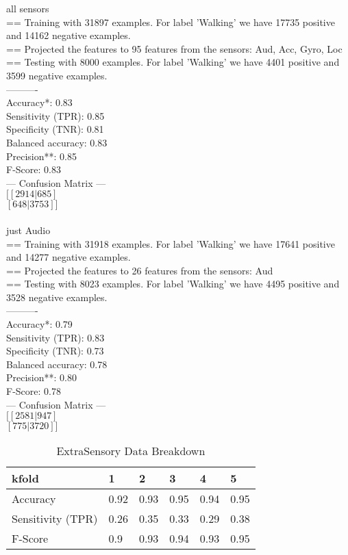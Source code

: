 \documentclass{UoNMCHA}
\numberwithin{equation}{section}
\begin{document}
all sensors
\\ == Training with 31897 examples. For label 'Walking' we have 17735 positive and 14162 negative examples.
\\ == Projected the features to 95 features from the sensors: Aud, Acc, Gyro, Loc
\\ == Testing with 8000 examples. For label 'Walking' we have 4401 positive and 3599 negative examples.
\\ ----------
\\ Accuracy*:         0.83
\\ Sensitivity (TPR): 0.85
\\ Specificity (TNR): 0.81
\\ Balanced accuracy: 0.83
\\ Precision**:       0.85
\\ F-Score:           0.83
\\ --- Confusion Matrix ---
\\ $[[2914 | 685]$
\\  $[ 648 | 3753]]$
\\ 
\\  just Audio
\\  == Training with 31918 examples. For label 'Walking' we have 17641 positive and 14277 negative examples.
\\ == Projected the features to 26 features from the sensors: Aud
\\ == Testing with 8023 examples. For label 'Walking' we have 4495 positive and 3528 negative examples.
\\ ----------
\\ Accuracy*:         0.79
\\ Sensitivity (TPR): 0.83
\\ Specificity (TNR): 0.73
\\ Balanced accuracy: 0.78
\\ Precision**:       0.80
\\ F-Score:           0.78
\\ --- Confusion Matrix ---
\\ $[[2581 | 947]$
\\  $[ 775 | 3720]]$

\begin{table}[h]
    \begin{center}  
        \caption{ExtraSensory Data Breakdown \cite{Vaizman2017}}\label{tab:ExtraSensoryDataBreakdown}
        \begin{tabular}{llllll}
            \hline\hline 
                kfold             & 1    & 2    & 3    & 4    & 5    \\
                \hline 
                Accuracy          & 0.92 & 0.93 & 0.95 & 0.94 & 0.95 \\
                Sensitivity (TPR) & 0.26 & 0.35 & 0.33 & 0.29 & 0.38 \\
                F-Score           & 0.9  & 0.93 & 0.94 & 0.93 & 0.95 \\
            \hline  
            \end{tabular}
    \end{center}
\end{table}
\end{document}
